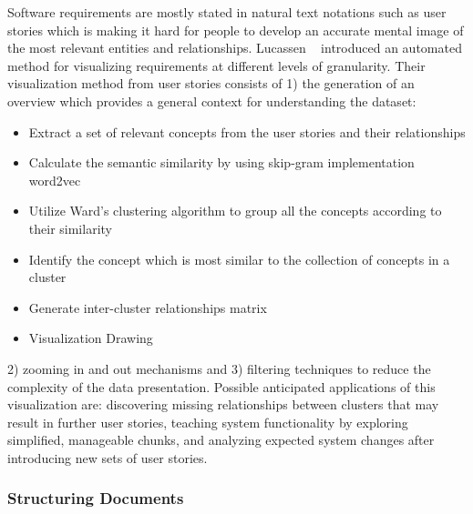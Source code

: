 Software requirements are mostly stated in natural text notations such as user stories which is making it hard for people to develop an accurate mental image of the most relevant entities and relationships. Lucassen \etal~\cite{Lucassen:2016} introduced an automated method for visualizing requirements at different levels of granularity. Their visualization method from user stories consists of 1) the generation of an overview which provides a general context for understanding the dataset: 
\begin{itemize}
\item Extract a set of relevant concepts from the user stories and their relationships 
\item Calculate the semantic similarity by using skip-gram implementation word2vec
\item Utilize Ward’s clustering algorithm to group all the concepts according to their similarity 
\item Identify the concept which is most similar to the collection of concepts in a cluster
\item Generate inter-cluster relationships matrix
\item Visualization Drawing
\end{itemize}
2) zooming in and out mechanisms and 3) filtering techniques to reduce the complexity of the data presentation. Possible anticipated applications of this visualization are: discovering missing relationships between clusters that may result in further user stories, teaching system functionality by exploring simplified, manageable chunks, and analyzing expected system changes after introducing new sets of user stories. 

\subsubsection{Structuring Documents}

